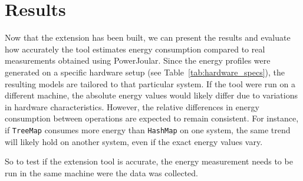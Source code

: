 \chapter{Results}\label{chapter:results}

Now that the extension has been built, we can present the results and evaluate how accurately the tool estimates energy consumption compared to real measurements obtained using PowerJoular. Since the energy profiles were generated on a specific hardware setup (see Table~\ref{tab:hardware_specs}), the resulting models are tailored to that particular system. If the tool were run on a different machine, the absolute energy values would likely differ due to variations in hardware characteristics. However, the relative differences in energy consumption between operations are expected to remain consistent. For instance, if \texttt{TreeMap} consumes more energy than \texttt{HashMap} on one system, the same trend will likely hold on another system, even if the exact energy values vary.

So to test if the extension tool is accurate, the energy measurement needs to be run in the same machine were the data was collected.









